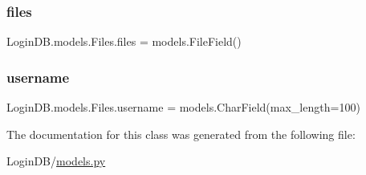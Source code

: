\subsubsection{\texorpdfstring{files}{files}}
{\footnotesize\ttfamily Login\+D\+B.\+models.\+Files.\+files = models.\+File\+Field()\hspace{0.3cm}{\ttfamily [static]}}

\mbox{\label{class_login_d_b_1_1models_1_1_files_aabe1671e1c6fce28800164fa8b5fc54a}} 
\subsubsection{\texorpdfstring{username}{username}}
{\footnotesize\ttfamily Login\+D\+B.\+models.\+Files.\+username = models.\+Char\+Field(max\+\_\+length=100)\hspace{0.3cm}{\ttfamily [static]}}



The documentation for this class was generated from the following file\+:\begin{DoxyCompactItemize}
\item 
Login\+D\+B/\hyperlink{models_8py}{models.\+py}\end{DoxyCompactItemize}
